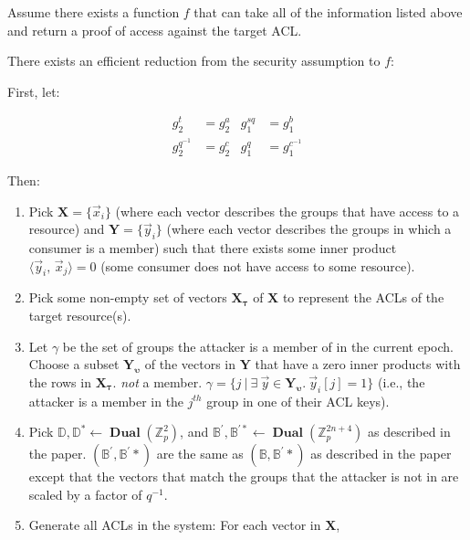 \documentclass[pdftex,12pt,a4papaer,twoside,notitlepage]{report}
\DeclareMathOperator{\dual}{\mathbf{Dual}}
\newcommand{\iprod}[2]{\langle #1,\,#2\rangle}
\begin{document}
Assume there exists a function $f$ that can take all of the information listed
above and return a proof of access against the target ACL.

There exists an efficient reduction from the security assumption to $f$:

First, let:

\begin{align*}
  g_2^t &= g_2^a & g_1^{sq} &= g_1^b \\
  g_2^{q^{-1}} &= g_2^c & g_1^{q} &= g_1^{c^{-1}}
\end{align*}

Then: \\

\begin{enumerate}
\item Pick $\mathbf{X} = \{\vec{x}_i\}$ (where each vector describes the groups
  that have access to a resource) and $\mathbf{Y} = \{\vec{y}_i\}$ (where each
  vector describes the groups in which a consumer is a member) 
  such that there exists some inner product $\iprod{\vec{y}_i}{\vec{x}_j} = 0$
  (some consumer does not have access to some resource).
\item Pick some non-empty set of vectors $\mathbf{X_\tau}$ of
  $\mathbf{X}$ to represent the ACLs of the target resource(s).
\item Let $\gamma$ be the set of groups the attacker is a member of in the
  current epoch. Choose a subset $\mathbf{Y_{\upsilon}}$ of the vectors in
  $\mathbf{Y}$ that have a zero inner products with the rows in
  $\mathbf{X_\tau}$. \emph{not} a member. $\gamma = \{ j ~ | ~ \exists~\vec{y}
  \in \mathbf{Y_\upsilon}.~\vec{y}_i[j] = 1 \}$ (i.e., the attacker is a member
  in the $j^{\mathit{th}}$ group in one of their ACL keys).
\item Pick $\mathbb{D}, \mathbb{D^*} \leftarrow
  \dual(\mathbb{Z}_p^2)$, and $\mathbb{B^\prime}, \mathbb{B^{\prime *}} \leftarrow
  \dual(\mathbb{Z}_p^{2n+4})$ as described in the paper. 
  $(\mathbb{B^\prime}, \mathbb{B^\prime *})$ are the same as $(\mathbb{B},
  \mathbb{B^\prime *})$ as described in the paper except that the vectors that
  match the groups that the attacker is not in are scaled by a factor of
  $q^{-1}$.
\item Generate all ACLs in the system: For each vector in $\mathbf{X}$,


\end{enumerate}
\end{document}
